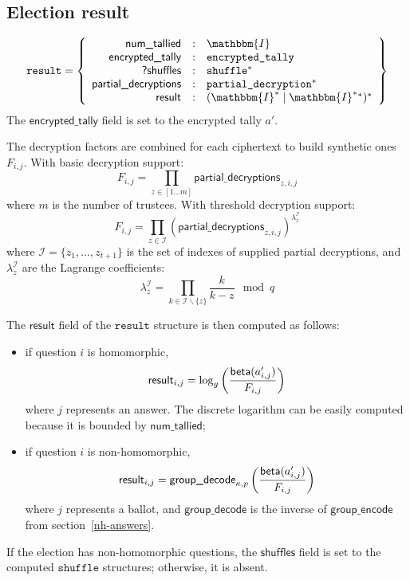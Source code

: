 \documentclass[a4paper]{article}
\newcommand{\I}{\mathbbm{I}}
\newcommand{\etally}{\texttt{encrypted\_tally}}
\newcommand{\pdecryption}{\texttt{partial\_decryption}}
\newcommand{\result}{\texttt{result}}
\begin{document}
\subsection{Election result}
\label{election-result}

\newcommand{\ntallied}{\textsf{num\_tallied}}
\newcommand{\etallylabel}{\textsf{encrypted\_tally}}
\newcommand{\pdlabel}{\textsf{partial\_decryptions}}
\newcommand{\resultlabel}{\textsf{result}}

\begin{gather*}
  \result=\left\{
    \begin{array}{rcl}
      \ntallied&:&\I\\
      \etallylabel&:&\etally\\
      \textsf{?shuffles}&:&\texttt{shuffle}^\ast\\
      \pdlabel&:&\pdecryption^\ast\\
      \resultlabel&:&(\I^\ast\mid\I^\ast{}^\ast)^\ast
    \end{array}
  \right\}
\end{gather*}
The $\etallylabel$ field is set to the encrypted tally $a'$.

The decryption factors are combined for each ciphertext to build
synthetic ones $F_{i,j}$. With basic decryption support:
\[
F_{i,j}=\prod_{z\in[1\dots m]}\pdlabel_{z,i,j}
\]
where $m$ is the number of trustees. With threshold decryption
support:
\[
F_{i,j}=\prod_{z\in\mathcal{I}}(\pdlabel_{z,i,j})^{\lambda_z^{\mathcal{I}}}
\]
where $\mathcal{I}=\{z_1,\dotsc,z_{t+1}\}$ is the set of indexes of
supplied partial decryptions, and $\lambda_z^{\mathcal{I}}$ are the
Lagrange coefficients:
\[
  \lambda_z^{\mathcal{I}}=\prod_{k\in\mathcal{I}\backslash\{z\}}\frac{k}{k-z}\mod q
\]

The $\resultlabel$ field of the $\result$ structure is then computed
as follows:
\begin{itemize}
\item if question $i$ is homomorphic,
  \[
    \resultlabel_{i,j}=\log_g\left(\frac{\betalabel(a'_{i,j})}{F_{i,j}}\right)
  \]
  where $j$ represents an answer. The discrete logarithm can be easily
  computed because it is bounded by $\ntallied$;
\item if question $i$ is non-homomorphic,
  \[
    \resultlabel_{i,j}=\textsf{group\_decode}_{\kappa,p}\left(\frac{\betalabel(a'_{i,j})}{F_{i,j}}\right)
  \]
  where $j$ represents a ballot, and $\textsf{group\_decode}$ is the
  inverse of $\textsf{group\_encode}$ from section~\ref{nh-answers}.
\end{itemize}
If the election has non-homomorphic questions, the $\textsf{shuffles}$
field is set to the computed $\texttt{shuffle}$ structures; otherwise,
it is absent.
\end{document}
